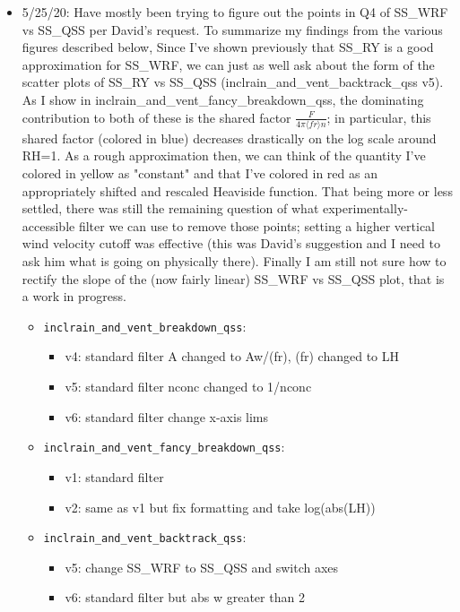 \documentclass{article}
\begin{document}
\begin{itemize}
	\item 5/25/20: Have mostly been trying to figure out the points in Q4 of SS\_WRF vs SS\_QSS per David's request. To summarize my findings from the various figures described below, Since I've shown previously that SS\_RY is a good approximation for SS\_WRF, we can just as well ask about the form of the scatter plots of SS\_RY vs SS\_QSS (inclrain\_and\_vent\_backtrack\_qss v5). As I show in inclrain\_and\_vent\_fancy\_breakdown\_qss, the dominating contribution to both of these is the shared factor $\frac{F}{4\pi\langle fr\rangle n}$; in particular, this shared factor (colored in blue) decreases drastically on the log scale around RH=1. As a rough approximation then, we can think of the quantity I've colored in yellow as "constant" and that I've colored in red as an appropriately shifted and rescaled Heaviside function. That being more or less settled, there was still the remaining question of what experimentally-accessible filter we can use to remove those points; setting a higher vertical wind velocity cutoff was effective (this was David's suggestion and I need to ask him what is going on physically there). Finally I am still not sure how to rectify the slope of the (now fairly linear) SS\_WRF vs SS\_QSS plot, that is a work in progress.
	\begin{itemize}
		\item \texttt{inclrain\_and\_vent\_breakdown\_qss}:
		\begin{itemize}
			\item v4: standard filter A changed to Aw/(fr), (fr) changed to LH
			\item v5: standard filter nconc changed to 1/nconc
			\item v6: standard filter change x-axis lims
		\end{itemize}
		\item \texttt{inclrain\_and\_vent\_fancy\_breakdown\_qss}:
		\begin{itemize}
			\item v1: standard filter
			\item v2: same as v1 but fix formatting and take log(abs(LH))
		\end{itemize}
		\item \texttt{inclrain\_and\_vent\_backtrack\_qss}:
		\begin{itemize}
			\item v5: change SS\_WRF to SS\_QSS and switch axes
			\item v6: standard filter but abs w greater than 2
		\end{itemize}

\end{itemize}
\end{itemize}
\end{document}
